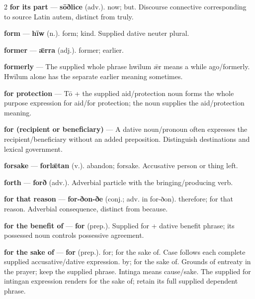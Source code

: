 \begin{multicols}{2}
\textbf{for its part} — \textbf{sōðlice} (adv.). now; but. Discourse connective corresponding to source Latin autem, distinct from truly.\par
\textbf{form} — \textbf{hīw} (n.). form; kind. Supplied dative neuter plural.\par
\textbf{former} — \textbf{ǣrra} (adj.). former; earlier.\par
\textbf{formerly} — The supplied whole phrase hwīlum ǣr means a while ago/formerly. Hwīlum alone has the separate earlier meaning sometimes.\par
\textbf{for protection} — Tō + the supplied aid/protection noun forms the whole purpose expression for aid/for protection; the noun supplies the aid/protection meaning.\par
\textbf{for (recipient or beneficiary)} — A dative noun/pronoun often expresses the recipient/beneficiary without an added preposition. Distinguish destinations and lexical government.\par
\textbf{forsake} — \textbf{forlǣtan} (v.). abandon; forsake. Accusative person or thing left.\par
\textbf{forth} — \textbf{forð} (adv.). Adverbial particle with the bringing/producing verb.\par
\textbf{for that reason} — \textbf{for-ðon-ðe} (conj.; adv. in for-ðon). therefore; for that reason. Adverbial consequence, distinct from because.\par
\textbf{for the benefit of} — \textbf{for} (prep.). Supplied for + dative benefit phrase; its possessed noun controls possessive agreement.\par
\textbf{for the sake of} — \textbf{for} (prep.). for; for the sake of. Case follows each complete supplied accusative/dative expression. by; for the sake of. Grounds of entreaty in the prayer; keep the supplied phrase. Intinga means cause/sake. The supplied for intingan expression renders for the sake of; retain its full supplied dependent phrase.\par

\end{multicols}
